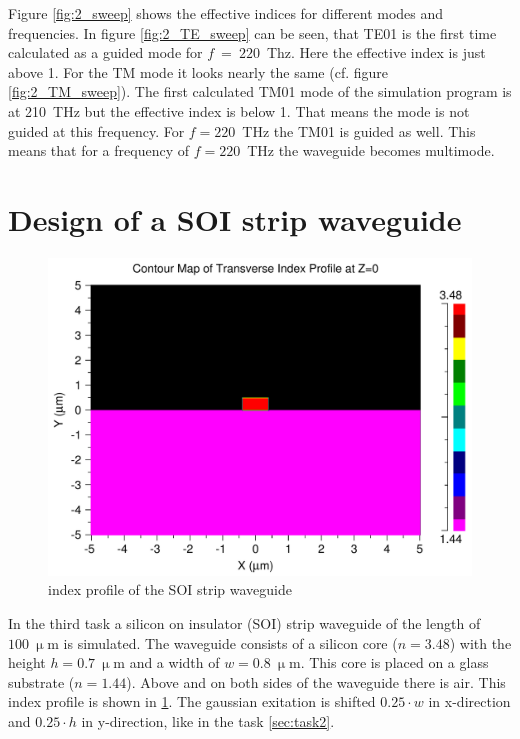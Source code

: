 Figure \ref{fig:2_sweep} shows the effective indices for different modes and frequencies. In figure \ref{fig:2_TE_sweep} can be seen, that TE01 is the first time calculated as a guided mode for $f~=~220$~Thz.  Here the effective index is just above 1. For the TM mode it looks nearly the same (cf. figure \ref{fig:2_TM_sweep}). The first calculated TM01 mode of the simulation program is at 210~THz but the effective index is below 1. That means the mode is not guided at this frequency. For $f = 220$~THz the TM01 is guided as well.
This means that for a frequency of $f = 220$~THz the waveguide becomes multimode.



\section{Design of a SOI strip waveguide}

\begin{figure}[h]%
\centering
\includegraphics[totalheight=5.5 cm]{Grafiken/3_index.pdf}%
\caption{index profile of the SOI strip waveguide}%
\label{fig:index_profile_3}%
\end{figure}
In the third task a silicon on insulator (SOI) strip waveguide of the length of $100~\upmu$m is simulated. The waveguide consists of a silicon core ($n=3.48$) with the height $h=0.7~\upmu$m and a width of $w=0.8~\upmu$m. This core is placed on a glass substrate ($n=1.44$). Above and on both sides of the waveguide there is air. This index profile is shown in \ref{fig:index_profile_3}. The gaussian exitation is shifted $0.25\cdot w$ in x-direction and $0.25\cdot h$ in y-direction, like in the task \ref{sec:task2}.

